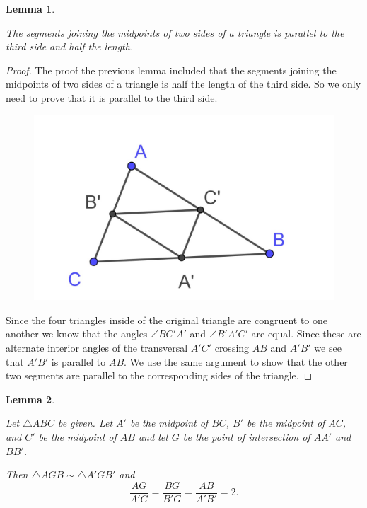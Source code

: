 \documentclass[
]{book}
\newtheorem{lemma}{Lemma}[chapter]
\theoremstyle{definition}
\theoremstyle{definition}
\theoremstyle{definition}
\theoremstyle{definition}
\theoremstyle{remark}
\begin{document}
\begin{lemma}
\protect\hypertarget{lem:unlabeled-div-183}{}\label{lem:unlabeled-div-183}

The segments joining the midpoints of two sides of a triangle is parallel to the third side and half the length.

\end{lemma}

\begin{proof}

The proof the previous lemma included that the segments joining the midpoints of two sides of a triangle is half the length of the third side. So we only need to prove that it is parallel to the third side.

\begin{figure}

{\centering \includegraphics[width=0.3\linewidth]{images/midpoint-triangle-similarity} 

}

\end{figure}

Since the four triangles inside of the original triangle are congruent to one another we know that the angles \(\angle BC'A'\) and \(\angle B'A'C'\) are equal. Since these are alternate interior angles of the transversal \(A'C'\) crossing \(AB\) and \(A'B'\) we see that \(A'B'\) is parallel to \(AB\). We use the same argument to show that the other two segments are parallel to the corresponding sides of the triangle.

\end{proof}

\begin{lemma}
\protect\hypertarget{lem:unlabeled-div-185}{}\label{lem:unlabeled-div-185}

Let \(\triangle ABC\) be given. Let \(A'\) be the midpoint of \(BC\), \(B'\) be the midpoint of \(AC\), and \(C'\) be the midpoint of \(AB\) and let \(G\) be the point of intersection of \(AA'\) and \(BB'\).

Then \(\triangle AGB \sim \triangle A'GB'\) and \[\frac{AG}{A'G} = \frac{BG}{B'G} = \frac{AB}{A'B'} = 2.\]

\end{lemma}
\end{document}
